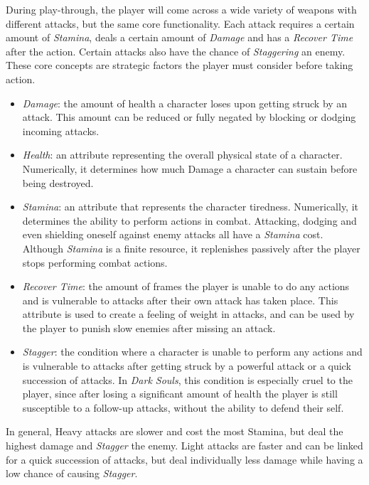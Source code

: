 During play-through, the player will come across a wide variety of weapons with different attacks, but the same core functionality. Each attack requires a certain amount of \emph{Stamina}, deals a certain amount of \emph{Damage} and has a \emph{Recover Time} after the action. Certain attacks also have the chance of \emph{Staggering} an enemy. These core concepts are strategic factors the player must consider before taking action. 

\begin{itemize}

\item \emph{Damage}: the amount of health a character loses upon getting struck by an attack. This amount can be reduced or fully negated by blocking or dodging incoming attacks.

\item \emph{Health}: an attribute representing the overall physical state of a character. Numerically, it determines how much Damage a character can sustain before being destroyed.

\item \emph{Stamina}: an attribute that represents the character tiredness. Numerically, it determines the ability to perform actions in combat. Attacking, dodging and even shielding oneself against enemy attacks all have a \emph{Stamina} cost. Although \emph{Stamina} is a finite resource, it replenishes passively after the player stops performing combat actions.

\item \emph{Recover Time}: the amount of frames the player is unable to do any actions and is vulnerable to attacks after their own attack has taken place. This attribute is used to create a feeling of weight in attacks, and can be used by the player to punish slow enemies after missing an attack.

\item \emph{Stagger}: the condition where a character is unable to perform any actions and is vulnerable to attacks after getting struck by a powerful attack or a quick succession of attacks. In \emph{Dark Souls}, this condition is especially cruel to the player, since after losing a significant amount of health the player is still susceptible to a follow-up attacks, without the ability to defend their self.

\end{itemize}

In general, Heavy attacks are slower and cost the most Stamina, but deal the highest damage and \emph{Stagger} the enemy. Light attacks are faster and can be linked for a quick succession of attacks, but deal individually less damage while having a low chance of causing \emph{Stagger}.

